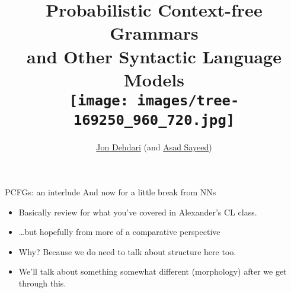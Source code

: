 \documentclass[xcolor=pdftex,x11names,table,hyperref]{beamer}
\begin{document}
\title{Probabilistic Context-free Grammars \\and Other Syntactic Language Models \\[1.5em]
 \texttt{[image: images/tree-169250\_960\_720.jpg]} \\[-1.0em]
 }
\author{\href{http://jon.dehdari.org}{Jon Dehdari} (and \href{http://www.coli.uni-saarland.de/~asayeed}{Asad Sayeed})}
\frame{\titlepage}

\begin{frame}{PCFGs: an interlude}
  And now for a little break from NNs\pause
  \begin{itemize}
  \item Basically review for what you've covered in Alexander's CL class.\pause
  \item \ldots but hopefully from more of a comparative perspective\pause
  \item Why? Because we do need to talk about structure here too.\pause
  \item We'll talk about something somewhat different (morphology)
    after we get through this.  
  \end{itemize}
\end{frame}
\end{document}
